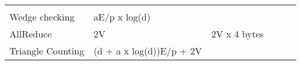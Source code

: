 \documentclass[10pt,oneside]{memoir}
\begin{document}
\begin{longtable}[]{@{}llllll@{}}
\begin{minipage}[t]{0.19\columnwidth}
\strut
\end{minipage} & \begin{minipage}[t]{0.11\columnwidth}\raggedright
\strut
\end{minipage} & \begin{minipage}[t]{0.12\columnwidth}\raggedright
\strut
\end{minipage}\tabularnewline
\begin{minipage}[t]{0.19\columnwidth}\raggedright
Wedge checking\strut
\end{minipage} & \begin{minipage}[t]{0.10\columnwidth}\raggedright
aE/p x log(d)\strut
\end{minipage} & \begin{minipage}[t]{0.13\columnwidth}\raggedright
\strut
\end{minipage} & \begin{minipage}[t]{0.19\columnwidth}\raggedright
\strut
\end{minipage} & \begin{minipage}[t]{0.11\columnwidth}\raggedright
\strut
\end{minipage} & \begin{minipage}[t]{0.12\columnwidth}\raggedright
\strut
\end{minipage}\tabularnewline
\begin{minipage}[t]{0.19\columnwidth}\raggedright
AllReduce\strut
\end{minipage} & \begin{minipage}[t]{0.10\columnwidth}\raggedright
2V\strut
\end{minipage} & \begin{minipage}[t]{0.13\columnwidth}\raggedright
2V x 4 bytes\strut
\end{minipage} & \begin{minipage}[t]{0.19\columnwidth}\raggedright
\strut
\end{minipage} & \begin{minipage}[t]{0.11\columnwidth}\raggedright
\strut
\end{minipage} & \begin{minipage}[t]{0.12\columnwidth}\raggedright
\strut
\end{minipage}\tabularnewline
\begin{minipage}[t]{0.19\columnwidth}\raggedright
Triangle Counting\strut
\end{minipage} & \begin{minipage}[t]{0.10\columnwidth}\raggedright
(d + a x log(d))E/p + 2V\strut

\end{minipage}
\end{longtable}
\end{document}
